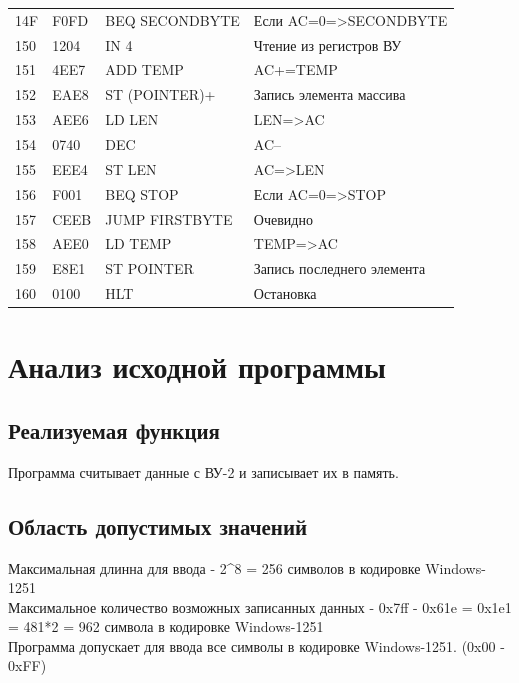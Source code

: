 \documentclass[14pt]{extreport}
\begin{document}
        \begin{tabular}{|P{1.5cm}|P{3cm}|P{4cm}|P{5cm}|}
                \hline
                14F& F0FD &BEQ SECONDBYTE& Если AC=0=>SECONDBYTE \\
                150& 1204 &IN 4& Чтение из регистров ВУ \\
                151& 4EE7 &ADD TEMP& AC+=TEMP \\
                152& EAE8 &ST (POINTER)+& Запись элемента массива \\
                153& AEE6 &LD LEN& LEN=>AC \\
                154& 0740 &DEC& AC-- \\
                155& EEE4 &ST LEN& AC=>LEN \\
                156& F001 &BEQ STOP& Если AC=0=>STOP \\
                157& CEEB &JUMP FIRSTBYTE& Очевидно\\
                158& AEE0 &LD TEMP& TEMP=>AC \\
                159& E8E1 &ST POINTER& Запись последнего элемента\\
                160& 0100 & HLT & Остановка \\
                \hline
                \end{tabular}


    \chapter{Анализ исходной программы}
    \section{Реализуемая функция}
        Программа считывает данные с ВУ-2 и записывает их в память.

    \section{Область допустимых значений}

        Максимальная длинна для ввода - 2^8 = 256 символов в кодировке Windows-1251 \\

        Максимальное количество возможных записанных данных - 0x7ff - 0x61e = 0x1e1 = 481*2 = 962 символа в кодировке Windows-1251 \\

        Программа допускает для ввода все символы в кодировке Windows-1251. (0x00 - 0xFF) \\
\end{document}
